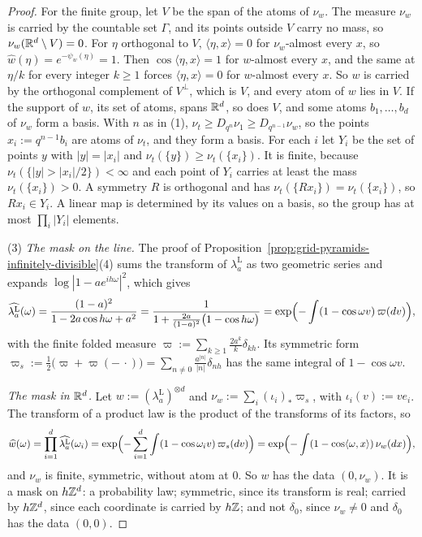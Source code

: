 \begin{proof}
For the finite group, let $V$ be the span of the atoms of $\nu_w$. The measure $\nu_w$ is carried
by the countable set $\Gamma$, and its points outside $V$ carry no mass, so $\nu_w(\mathbb{R}^d \setminus
V) = 0$. For $\eta$ orthogonal to $V$, $\langle\eta, x\rangle = 0$ for $\nu_w$-almost every $x$, so
$\widehat{w}(\eta) = e^{-\psi_w(\eta)} = 1$. Then $\cos\langle\eta, x\rangle = 1$ for $w$-almost
every $x$, and the same at $\eta/k$ for every integer $k \ge 1$ forces $\langle\eta, x\rangle = 0$
for $w$-almost every $x$. So $w$ is carried by the orthogonal complement of $V^\perp$, which is $V$,
and every atom of $w$ lies in $V$. If the support of $w$, its set of atoms, spans $\mathbb{R}^d$, so does
$V$, and some atoms $b_1, \dots, b_d$ of $\nu_w$ form a basis. With $n$ as in (1),
$\nu_t \ge D_{q^n}\nu_1 \ge D_{q^{n-1}}\nu_w$, so the points $x_i := q^{n-1}b_i$ are atoms of
$\nu_t$, and they form a basis. For each $i$ let $Y_i$ be the set of points $y$ with
$|y| = |x_i|$ and $\nu_t(\{y\}) \ge \nu_t(\{x_i\})$. It is finite, because
$\nu_t(\{|y| > |x_i|/2\}) < \infty$ and each point of $Y_i$ carries at least the mass
$\nu_t(\{x_i\}) > 0$. A symmetry $R$ is orthogonal and has $\nu_t(\{Rx_i\}) = \nu_t(\{x_i\})$, so
$Rx_i \in Y_i$. A linear map is determined by its values on a basis, so the group has at most
$\prod_i|Y_i|$ elements.

(3) \emph{The mask on the line.} The proof of
Proposition~\ref{prop:grid-pyramids-infinitely-divisible}(4) sums the transform of
$\lambda^{\mathrm L}_a$ as two geometric series and expands $\log|1 - ae^{ih\omega}|^2$, which gives
\[
\widehat{\lambda^{\mathrm L}_a}(\omega) = \frac{(1-a)^2}{1 - 2a\cos h\omega + a^2}
= \frac{1}{1 + \frac{2a}{(1-a)^2}\bigl(1 - \cos h\omega\bigr)}
= \exp\Bigl(-\int(1 - \cos\omega v)\,\varpi(dv)\Bigr),
\]
with the finite folded \Levy{} measure $\varpi := \sum_{k \ge 1}\tfrac{2a^k}{k}\delta_{kh}$. Its
symmetric form $\varpi_s := \tfrac12\bigl(\varpi + \varpi(-\,\cdot)\bigr) =
\sum_{n \ne 0}\tfrac{a^{|n|}}{|n|}\delta_{nh}$ has the same integral of $1 - \cos\omega v$.

\emph{The mask in $\mathbb{R}^d$.} Let $w := (\lambda^{\mathrm L}_a)^{\otimes d}$ and
$\nu_w := \sum_i(\iota_i)_*\varpi_s$, with $\iota_i(v) := ve_i$. The transform of a product law is
the product of the transforms of its factors, so
\[
\widehat{w}(\omega) = \prod_{i=1}^d\widehat{\lambda^{\mathrm L}_a}(\omega_i)
= \exp\Bigl(-\sum_{i=1}^d\int(1 - \cos\omega_iv)\,\varpi_s(dv)\Bigr)
= \exp\Bigl(-\int(1 - \cos\langle\omega, x\rangle)\,\nu_w(dx)\Bigr),
\]
and $\nu_w$ is finite, symmetric, without atom at $0$. So $w$ has the data $(0, \nu_w)$. It is a
mask on $h\mathbb{Z}^d$: a probability law; symmetric, since its transform is real; carried by
$h\mathbb{Z}^d$, since each coordinate is carried by $h\mathbb{Z}$; and not $\delta_0$, since $\nu_w \ne 0$ and
$\delta_0$ has the data $(0, 0)$.


\end{proof}

